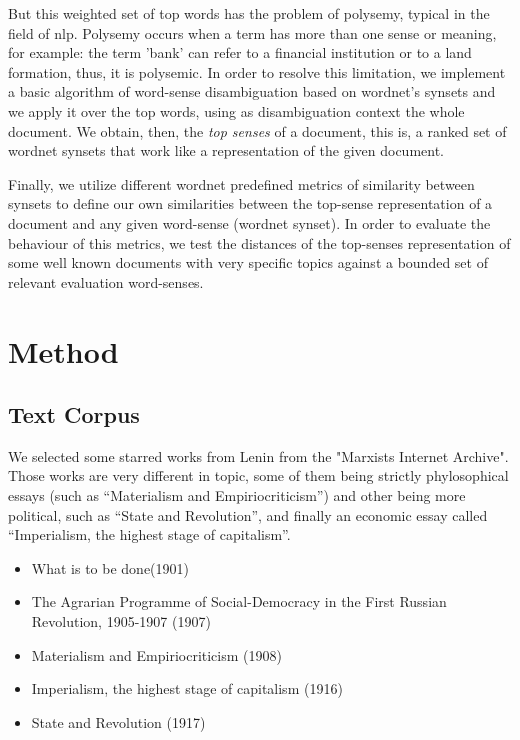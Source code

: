 \documentclass{pnastwo}
\begin{document}
\begin{article}
But this weighted set of top words has the problem of polysemy, typical in the field of nlp. Polysemy occurs when a term has more than one sense or meaning, for example: the term 'bank' can refer to a financial institution or to a land formation, thus, it is polysemic. In order to resolve this limitation, we implement a basic algorithm of word-sense disambiguation based on wordnet's synsets and we apply it over the top words, using as disambiguation context the whole document. We obtain, then, the \textit{top senses} of a document, this is, a ranked set of wordnet synsets that work like a representation of the given document.

Finally, we utilize different wordnet predefined metrics of similarity between synsets to define our own similarities between the top-sense representation of a document and any given word-sense (wordnet synset). In order to evaluate the behaviour of this metrics, we test the distances of the top-senses representation of some well known documents with very specific topics against a bounded set of relevant evaluation word-senses. 


\section{Method}
\subsection{Text Corpus}

We selected some starred works from Lenin from the "Marxists Internet Archive"\cite{LENIN}. Those works are very different in topic, some of them being strictly phylosophical essays (such as ``Materialism and Empiriocriticism'') and other being more political, such as ``State and Revolution'', and finally an economic essay called ``Imperialism, the highest stage of capitalism''. 

\begin{itemize}
  \item What is to be done(1901)
  \item The Agrarian Programme of Social-Democracy in the First Russian Revolution, 1905-1907 (1907)
  \item Materialism and Empiriocriticism (1908)
  \item Imperialism, the highest stage of capitalism (1916)
  \item State and Revolution (1917)
\end{itemize}



\end{article}
\end{document}
